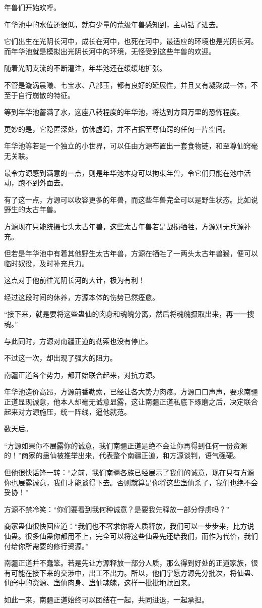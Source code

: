 \begin{this_body}
年兽们开始欢呼。

年华池中的水位还很低，就有少量的荒级年兽感知到，主动钻了进去。

它们出生在光阴长河中，成长在河中，也死在河中，最适应的环境也是光阴长河。而年华池就是模拟出光阴长河中的环境，无怪受到这些年兽的欢迎。

随着光阴支流的不断灌注，年华池还在缓缓地扩张。

不管是漩涡晨曦、七宝水、八部玉，都有良好的延展性，并且又有凝聚成一体，不至于自行崩散的特征。

等到年华池蓄满了水，这座八转程度的年华池，将达到方圆万里的恐怖程度。

更妙的是，它隐匿深处，仿佛虚幻，并不占据至尊仙窍的任何一片空间。

年华池等若是一个独立的小世界，可以任由方源布置出一套食物链，和至尊仙窍毫无关联。

最令方源感到满意的一点，则是年华池本身可以拘束年兽，令它们只能在池中活动，跑不到外面去。

有了这一点，方源可以收容更多的年兽，而这些年兽完全可以是野生状态。比如说野生的太古年兽。

方源现在只能统摄七头太古年兽，这些太古年兽若是战损牺牲，方源别无兵源补充。

但若是年华池中有着其他野生太古年兽，方源在牺牲了一两头太古年兽猴，便可以临时奴役，及时补充兵力。

这点对于他前往光阴长河的大计，极为有利！

经过这段时间的休养，方源本体的伤势已然痊愈。

“接下来，就是要将这些蛊仙的肉身和魂魄分离，然后将魂魄摄取出来，再一一搜魂。”

与此同时，方源对南疆正道的勒索也没有停止。

不过这一次，却出现了强大的阻力。

南疆正道各个势力，都开始联合起来，对抗方源。

年华池造价高昂，方源前番勒索，已经让各大势力肉疼。方源口口声声，要求南疆正道显现诚意，他本人却毫无诚意显露，这让南疆正道私底下琢磨之后，决定联合起来对方源施压，统一阵线，逼他就范。

数天后。

“方源如果你不展露你的诚意，我们南疆正道是绝不会让你再得到任何一份资源的！”商家的蛊仙被推举出来，代表整个南疆正道，和方源谈判，语气强硬。

但他很快话锋一转：“之前，我们南疆各族已经展示了我们的诚意，现在只有方源你也展露诚意，我们才能谈得下去。否则就算是你将这些蛊仙杀了，我们也绝不会妥协！”

方源不禁冷笑：“你们要看到我何种诚意？是要我先释放一部分俘虏吗？”

商家蛊仙很快回应道：“我们也不奢求你将人质释放，我们可以一步步来，比方说仙蛊。很多仙蛊你都用不上，完全可以将这些仙蛊先还给我们，而作为代价，我们付给你所需要的修行资源。”

南疆正道并不蠢笨。若是先让方源释放一部分人质，那么得到好处的正道家族，很有可能在接下来的交涉中，出工不出力。所以，他们宁愿方源先分批次，将仙蛊、仙窍中的资源、蛊仙肉身、蛊仙魂魄，这样一批批地赎回来。

如此一来，南疆正道始终可以团结在一起，共同进退，一起承担。

\end{this_body}

